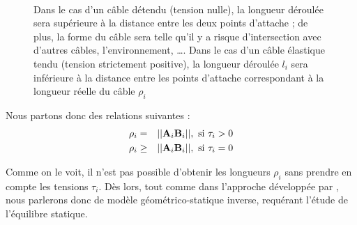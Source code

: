 \begin{figure}[!ht]
  \centering
\hfill
\\
    \caption{\footnotesize{Dans le cas d'un câble détendu (tension nulle), la 
longueur déroulée sera supérieure à la distance entre les deux points d'attache 
; de plus, la forme du câble sera telle qu'il y a risque d'intersection avec 
d'autres câbles, l'environnement, \dots. Dans le cas d'un câble élastique tendu 
(tension strictement positive), la longueur déroulée $l_i$ sera inférieure à la 
distance entre les points d'attache correspondant à la longueur réelle du 
câble $\rho_i$}}
\label{intro:fig6}
\end{figure}

Nous partons donc des relations suivantes :
\begin{eqnarray}
\rho_i &=& ||{\bf A}_i {\bf B}_i||, \hbox{ si } \tau_i > 0 \\ 
\rho_i &\geq& ||{\bf A}_i {\bf B}_i||, \hbox{ si } \tau_i = 0
\label{intro:eq1}
\end{eqnarray}

Comme on le voit, il n'est pas possible d'obtenir les longueurs $\rho_i$ sans 
prendre en compte les tensions $\tau_i$. Dès lors, tout comme dans l'approche 
développée par \cite{2010:Carricato.Merlet}, nous parlerons donc de modèle 
géométrico-statique inverse, requérant l'étude de l'équilibre statique.

